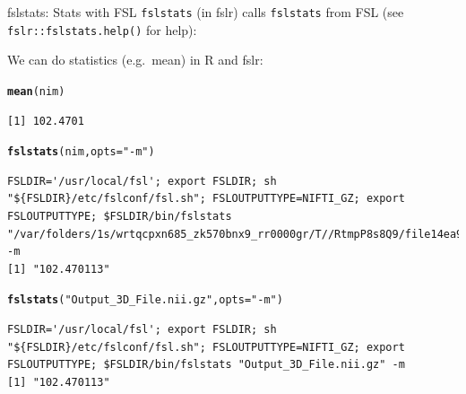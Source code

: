\documentclass[11pt]{beamer}\usepackage[]{graphicx}\usepackage[]{color}
\makeatletter
\newcommand{\hlstr}[1]{\textcolor[rgb]{0.192,0.494,0.8}{#1}}%
\newcommand{\hlstd}[1]{\textcolor[rgb]{0.345,0.345,0.345}{#1}}%
\newcommand{\hlkwc}[1]{\textcolor[rgb]{0.333,0.667,0.333}{#1}}%
\newcommand{\hlkwd}[1]{\textcolor[rgb]{0.737,0.353,0.396}{\textbf{#1}}}%
\newenvironment{kframe}{%
 \def\at@end@of@kframe{}%
 \ifinner\ifhmode%
  \def\at@end@of@kframe{\end{minipage}}%
  \begin{minipage}{\columnwidth}%
 \fi\fi%
 \def\FrameCommand##1{\hskip\@totalleftmargin \hskip-\fboxsep
 \colorbox{shadecolor}{##1}\hskip-\fboxsep
     \hskip-\linewidth \hskip-\@totalleftmargin \hskip\columnwidth}%
 \MakeFramed {\advance\hsize-\width
   \@totalleftmargin\z@ \linewidth\hsize
   \@setminipage}}%
 {\par\unskip\endMakeFramed%
 \at@end@of@kframe}
\newenvironment{knitrout}{}{} %
\makeatother
\begin{document}
\begin{frame}[fragile]{fslstats: Stats with FSL}
\verb|fslstats| (in fslr) calls \verb|fslstats| from FSL (see \verb|fslr::fslstats.help()| for help):

We can do statistics (e.g.~mean) in R and fslr:
\begin{knitrout}
\color{fgcolor}\begin{kframe}
\begin{alltt}
\hlkwd{mean}\hlstd{(nim)}
\end{alltt}
\begin{verbatim}
[1] 102.4701
\end{verbatim}
\begin{alltt}
\hlkwd{fslstats}\hlstd{(nim,} \hlkwc{opts}\hlstd{=}\hlstr{"-m"}\hlstd{)}
\end{alltt}
\begin{verbatim}
FSLDIR='/usr/local/fsl'; export FSLDIR; sh "${FSLDIR}/etc/fslconf/fsl.sh"; FSLOUTPUTTYPE=NIFTI_GZ; export FSLOUTPUTTYPE; $FSLDIR/bin/fslstats "/var/folders/1s/wrtqcpxn685_zk570bnx9_rr0000gr/T//RtmpP8s8Q9/file14ea99f716bc.nii.gz" -m 
[1] "102.470113"
\end{verbatim}
\begin{alltt}
\hlkwd{fslstats}\hlstd{(}\hlstr{"Output_3D_File.nii.gz"}\hlstd{,} \hlkwc{opts} \hlstd{=} \hlstr{"-m"}\hlstd{)}
\end{alltt}
\begin{verbatim}
FSLDIR='/usr/local/fsl'; export FSLDIR; sh "${FSLDIR}/etc/fslconf/fsl.sh"; FSLOUTPUTTYPE=NIFTI_GZ; export FSLOUTPUTTYPE; $FSLDIR/bin/fslstats "Output_3D_File.nii.gz" -m 
[1] "102.470113"
\end{verbatim}
\end{kframe}
\end{knitrout}


\end{frame}
\end{document}
